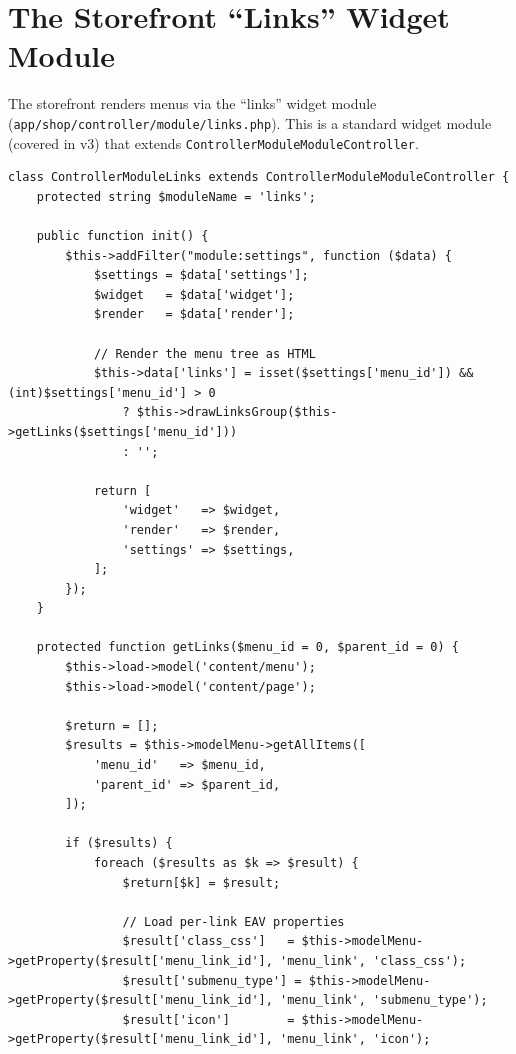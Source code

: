 \documentclass[11pt,a4paper]{article}
\begin{document}
\section{The Storefront ``Links'' Widget Module}\label{sec:links-widget}

The storefront renders menus via the ``links'' widget module
(\texttt{app/shop/controller/module/links.php}). This is a standard
widget module (covered in v3) that extends
\texttt{ControllerModuleModuleController}.

\begin{lstlisting}[caption={\texttt{ControllerModuleLinks} --- the links widget (abridged).},label={lst:links-widget}]
class ControllerModuleLinks extends ControllerModuleModuleController {
    protected string $moduleName = 'links';

    public function init() {
        $this->addFilter("module:settings", function ($data) {
            $settings = $data['settings'];
            $widget   = $data['widget'];
            $render   = $data['render'];

            // Render the menu tree as HTML
            $this->data['links'] = isset($settings['menu_id']) && (int)$settings['menu_id'] > 0
                ? $this->drawLinksGroup($this->getLinks($settings['menu_id']))
                : '';

            return [
                'widget'   => $widget,
                'render'   => $render,
                'settings' => $settings,
            ];
        });
    }

    protected function getLinks($menu_id = 0, $parent_id = 0) {
        $this->load->model('content/menu');
        $this->load->model('content/page');

        $return = [];
        $results = $this->modelMenu->getAllItems([
            'menu_id'   => $menu_id,
            'parent_id' => $parent_id,
        ]);

        if ($results) {
            foreach ($results as $k => $result) {
                $return[$k] = $result;

                // Load per-link EAV properties
                $result['class_css']   = $this->modelMenu->getProperty($result['menu_link_id'], 'menu_link', 'class_css');
                $result['submenu_type'] = $this->modelMenu->getProperty($result['menu_link_id'], 'menu_link', 'submenu_type');
                $result['icon']        = $this->modelMenu->getProperty($result['menu_link_id'], 'menu_link', 'icon');


\end{lstlisting}
\end{document}
